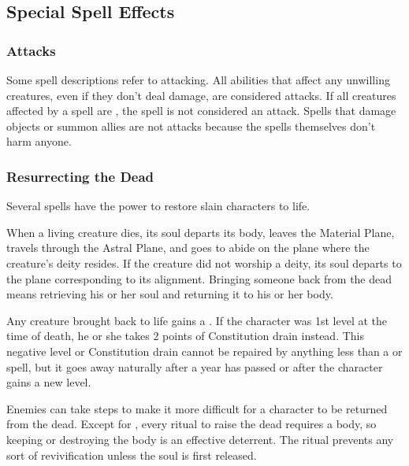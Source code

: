     \subsection{Special Spell Effects}

        \subsubsection{Attacks}
            Some spell descriptions refer to attacking.
            All abilities that affect any unwilling creatures, even if they don't deal damage, are considered attacks.
            If all creatures affected by a spell are , the spell is not considered an attack.
            Spells that damage objects or summon allies are not attacks because the spells themselves don't harm anyone.

        \subsubsection{Resurrecting the Dead}\label{Resurrecting the Dead}

            Several spells have the power to restore slain characters to life.

            When a living creature dies, its soul departs its body, leaves the Material Plane, travels through the Astral Plane, and goes to abide on the plane where the creature's deity resides.
            If the creature did not worship a deity, its soul departs to the plane corresponding to its alignment.
            Bringing someone back from the dead means retrieving his or her soul and returning it to his or her body.

             Any creature brought back to life gains a \negativelevel.
            If the character was 1st level at the time of death, he or she takes 2 points of Constitution drain instead.
            This negative level or Constitution drain cannot be repaired by anything less than a  or  spell, but it goes away naturally after a year has passed or after the character gains a new level.

             Enemies can take steps to make it more difficult for a character to be returned from the dead.
            Except for , every ritual to raise the dead requires a body, so keeping or destroying the body is an effective deterrent.
            The  ritual prevents any sort of revivification unless the soul is first released.

